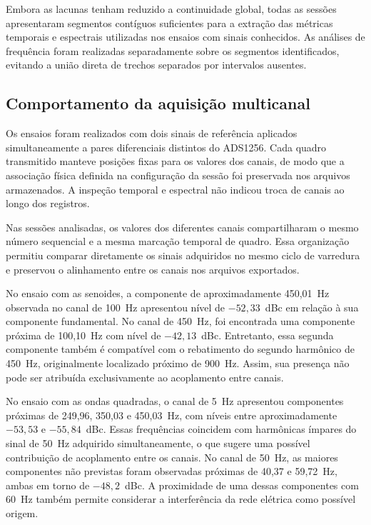 \documentclass[a4paper,12pt]{fcte}
\begin{document}
Embora as lacunas tenham reduzido a continuidade global, todas as sessões apresentaram segmentos contíguos suficientes para a extração das métricas temporais e espectrais utilizadas nos ensaios com sinais conhecidos. As análises de frequência foram realizadas separadamente sobre os segmentos identificados, evitando a união direta de trechos separados por intervalos ausentes.

\subsection{Comportamento da aquisição multicanal}
\label{subsec:desempenho_multicanal}

Os ensaios foram realizados com dois sinais de referência aplicados simultaneamente a pares diferenciais distintos do ADS1256. Cada quadro transmitido manteve posições fixas para os valores dos canais, de modo que a associação física definida na configuração da sessão foi preservada nos arquivos armazenados. A inspeção temporal e espectral não indicou troca de canais ao longo dos registros.

Nas sessões analisadas, os valores dos diferentes canais compartilharam o mesmo número sequencial e a mesma marcação temporal de quadro. Essa organização permitiu comparar diretamente os sinais adquiridos no mesmo ciclo de varredura e preservou o alinhamento entre os canais nos arquivos exportados.

No ensaio com as senoides, a componente de aproximadamente 450,01~Hz observada no canal de 100~Hz apresentou nível de $-52,33$~dBc em relação à sua componente fundamental. No canal de 450~Hz, foi encontrada uma componente próxima de 100,10~Hz com nível de $-42,13$~dBc. Entretanto, essa segunda componente também é compatível com o rebatimento do segundo harmônico de 450~Hz, originalmente localizado próximo de 900~Hz. Assim, sua presença não pode ser atribuída exclusivamente ao acoplamento entre canais.

No ensaio com as ondas quadradas, o canal de 5~Hz apresentou componentes próximas de 249,96, 350,03 e 450,03~Hz, com níveis entre aproximadamente $-53,53$ e $-55,84$~dBc. Essas frequências coincidem com harmônicas ímpares do sinal de 50~Hz adquirido simultaneamente, o que sugere uma possível contribuição de acoplamento entre os canais. No canal de 50~Hz, as maiores componentes não previstas foram observadas próximas de 40,37 e 59,72~Hz, ambas em torno de $-48,2$~dBc. A proximidade de uma dessas componentes com 60~Hz também permite considerar a interferência da rede elétrica como possível origem.
\end{document}
